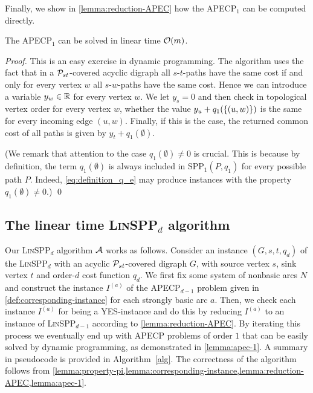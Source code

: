 Finally, we show in \cref{lemma:reduction-APEC} how the APECP$_1$ can be computed directly.
\begin{lemma}
\label{lemma:apec-1}
    The APECP$_1$ can be solved in linear time $\mathcal{O}(m)$.
\end{lemma}
\begin{proof}
    This is an easy exercise in dynamic programming. The algorithm uses the fact that in a $\mathcal{P}_{st}$-covered acyclic digraph all $s$-$t$-paths have the same cost if and only for every vertex $w$ all $s$-$w$-paths have the same cost. Hence we can introduce a variable $y_w \in \mathbb{R}$ for every vertex $w$. We let $y_s = 0$ and then check in topological vertex order for every vertex $w$, whether the value $y_u + q_1(\{ (u,w) \})$ is the same for every incoming edge $(u, w)$. Finally, if this is the case, the returned common cost of all paths is given by $y_t + q_1(\emptyset)$.
    
    (We remark that attention to the case $q_1(\emptyset) \neq 0$ is crucial. This is because by definition, the term $q_1(\emptyset)$ is always included in SPP$_1(P, q_1)$ for every possible path $P$. Indeed, \cref{eq:definition_q_e} may produce instances with the property $q_1(\emptyset) \neq 0$.)
    \qed
\end{proof}


\subsection{The linear time \textsc{Lin}SPP$_d$ algorithm}
\label{subsection:alg}
Our \textsc{Lin}SPP$_d$ algorithm ${\cal A}$ works as follows.
Consider an instance $(G,s,t,q_d)$ of the \textsc{Lin}SPP$_d$ with an acyclic $\mathcal{P}_{st}$-covered digraph $G$, with source vertex $s$, sink vertex $t$ and order-$d$ cost function $q_d$. We first fix some system of nonbasic arcs $N$ and construct the instance $I^{(a)}$ of the  APECP$_{d-1}$ problem given in \cref{def:corresponding-instance} for each strongly basic arc $a$. 
Then,  we  check each instance  $I^{(a)}$ for being a  \textsc{YES}-instance and
do this by reducing  $I^{(a)}$  to  an instance of \textsc{Lin}SPP$_{d-1}$ according to \cref{lemma:reduction-APEC}.
By iterating this process we eventually end up with APECP problems of order $1$ that can be easily solved by  dynamic programming, as demonstrated in \cref{lemma:apec-1}. A summary in pseudocode is provided in Algorithm~\ref{alg}. The correctness of the algorithm follows from \cref{lemma:property-pi,lemma:corresponding-instance,lemma:reduction-APEC,lemma:apec-1}.

